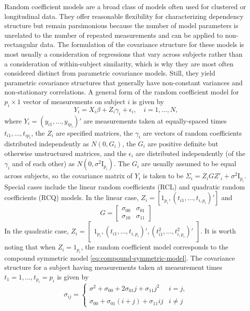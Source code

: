 Random coefficient models are a broad class of models often used for clustered or longitudinal data. They offer reasonable flexibility for characterizing dependency structure but remain parsimonious because the number of model parameters is unrelated to the number of repeated measurements and can be applied to non-rectangular data.  The formulation of the covariance structure for these models is most usually a consideration of regressions that vary across subjects rather than a consideration of within-subject similarity, which is why they are most often considered distinct from parametric covariance models. Still, they yield parametric covariance structures that generally have non-constant variances and non-stationary correlations.  A general form of the random coefficient model for $p_i \times 1$ vector of measurements on subject $i$ is given by 
\begin{equation}
Y_i = X_i\beta + Z_i \gamma_i + \epsilon_i, \quad i = 1, \dots, N,
\end{equation}
\noindent
where $Y_i = \left(y_{i1}, \dots, y_{ip_i}\right)'$ are measurements taken at equally-spaced times $t_{i1},\dots,  t_{ip_i}$, the $Z_i$ are specified matrices, the $\gamma_i$ are vectors of random coefficients distributed independently as $N \left(0, G_i\right)$, the $G_i$ are positive definite but otherwise unstructured matrices, and the $\epsilon_i$ are distributed independently (of the $\gamma_i$ and of each other) as $N \left(0, \sigma^2 \mathrm{I}_{p_i}\right)$. The $G_i$ are usually assumed to be equal across subjects, so the covariance matrix of $Y_i$ is taken to be $\Sigma_i = Z_i GZ'_i + \sigma^2 \mathrm{I}_{p_i}$. Special cases include the linear random coefficients (RCL) and quadratic random coefficients (RCQ) models. In the linear case, $Z_i = \left[1_{p_i} , \left(t_{i1},\dots,t_{i, p_i}\right)'\right]$ and 
\begin{equation*}
G = \begin{bmatrix}
\sigma_{00} & \sigma_{01} \\
\sigma_{10} & \sigma_{11} 
\end{bmatrix}
\end{equation*}
\noindent
In the quadratic case, $Z_i =\begin{bmatrix}1_{p_i}, \left(t_{i1}, \dots, t_{i,p_i}\right)', \left(t^2_{i1}, \dots, t^2_{i,p_i}\right)'\end{bmatrix}$. It is worth noting that when $Z_i = 1_{p_i}$, the random coefficient model corresponds to the compound symmetric model \eqref{eq:compound-symmetric-model}. The covariance structure for a subject having measurements taken at measurement times $t_1 = 1, \dots,t_{p_i} = p_i$ is given by  
\begin{equation}
\sigma_{ij} = \left\{ \begin{array}{ll}
\sigma^2 + \sigma_{00} + 2\sigma_{01}j + \sigma_{11}j^2 &  i= j, \\
& \\
{\sigma_{00} + \sigma_{01}\left(i + j\right) + \sigma_{11} ij} &  i \ne j 
\end{array}\right.
\end{equation}

